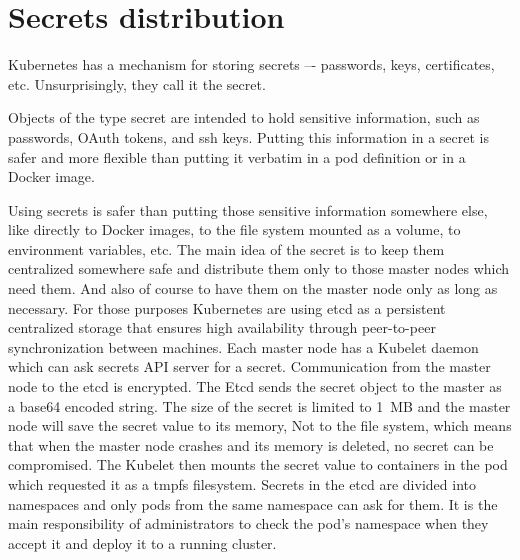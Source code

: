 \chapter{Secrets distribution}

Kubernetes has a mechanism for storing secrets –- passwords, keys, certificates, etc. Unsurprisingly, they call it the secret.

Objects of the type secret are intended to hold sensitive information, such as passwords, OAuth tokens, and ssh keys. Putting this information in a secret is safer and more flexible than putting it verbatim in a pod definition or in a Docker image. \cite{secrets} 

Using secrets is safer than putting those sensitive information somewhere else, like directly to Docker images, to the file system mounted as a volume, to environment variables, etc. The main idea of the secret is to keep them centralized somewhere safe and distribute them only to those master nodes which need them. And also of course to have them on the master node only as long as necessary. For those purposes Kubernetes are using etcd as a persistent centralized storage that ensures high availability through peer-to-peer synchronization between machines. Each master node has a Kubelet daemon which can ask secrets API server for a secret. Communication from the master node to the etcd is encrypted. The Etcd sends the secret object to the master as a base64 encoded string. The size of the secret is limited to 1~MB and the master node will save the secret value to its memory, Not to the file system, which means that when the master node crashes and its memory is deleted, no secret can be compromised. The Kubelet then mounts the secret value to containers in the pod which requested it as a tmpfs filesystem. Secrets in the etcd are divided into namespaces and only pods from the same namespace can ask for them. It is the main responsibility of administrators to check the pod’s namespace when they accept it and deploy it to a running cluster.

